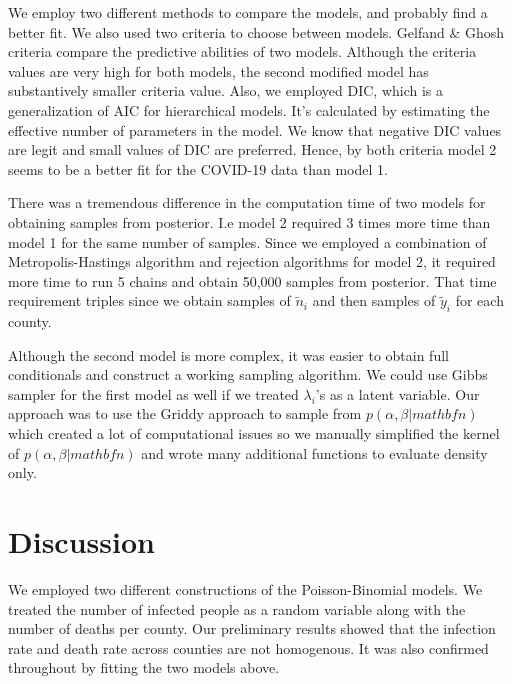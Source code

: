 \documentclass[11pt,twocolumn]{asaproc}
\begin{document}
We employ two different methods to compare the models, and probably find a better fit. We also used two criteria to choose between models. Gelfand \& Ghosh criteria compare the predictive abilities of two models. Although the criteria values are very high for both models, the second modified model has substantively smaller criteria value. Also, we employed DIC, which is a generalization of AIC for hierarchical models. It's calculated by estimating the effective number of parameters in the model. We know that negative DIC values are legit and small values of DIC are preferred. Hence, by both criteria model 2 seems to be a better fit for the COVID-19 data than model 1. 


There was a tremendous difference in the computation time of two models for obtaining samples from posterior. I.e model 2 required 3 times more time than model 1 for the same number of samples. Since we employed a combination of Metropolis-Hastings algorithm and rejection algorithms for model 2, it required more time to run 5 chains and obtain 50,000 samples from posterior. That time requirement triples since we obtain samples of $\tilde{n}_i$ and then samples of $\tilde{y}_i$ for each county. 

Although the second model is more complex, it was easier to obtain full conditionals and construct a working sampling algorithm. We could use Gibbs sampler for the first model as well if we treated $\lambda_i$'s as a latent variable. Our approach was to use the Griddy approach to sample from $p(\alpha, \beta | mathbf{n})$ which created a lot of computational issues so we manually simplified the kernel of $p(\alpha, \beta | mathbf{n})$ and wrote many additional functions to evaluate density only. 


















\section{Discussion} 

We employed two different constructions of the Poisson-Binomial models. We treated the number of infected people as a random variable along with the number of deaths per county. Our preliminary results showed that the infection rate and death rate across counties are not homogenous. It was also confirmed throughout by fitting the two models above. 
\end{document}
